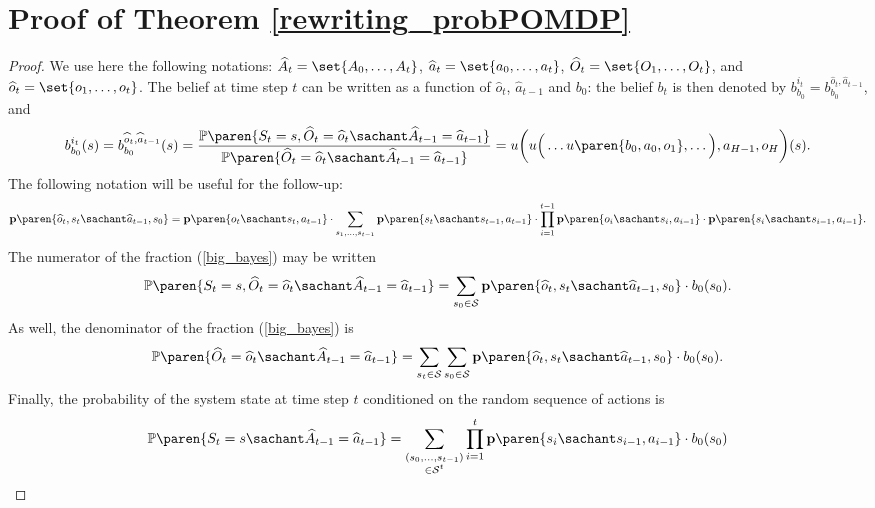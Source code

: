 \section{Proof of Theorem \ref{rewriting_probPOMDP}}
\begin{proof}
We use here the following notations: 
$\widehat{A}_{t} = \set{ A_0, \ldots, A_{t} }$,
$\widehat{a}_{t} = \set{ a_0, \ldots, a_{t} }$,
$\widehat{O}_t = \set{ O_1, \ldots, O_t }$,
and $\widehat{o}_t = \set{ o_1, \ldots, o_t }$.
The belief at time step $t$ can be written
as a function of $\widehat{o}_t$, $\widehat{a}_{t-1}$ and $b_0$:
the belief $b_t$ is then denoted by $b^{i_t}_{b_0} = b^{\widehat{o}_t,\widehat{a}_{t-1}}_{b_0}$, and
\begin{equation}
b^{i_t}_{b_0}(s) = b^{\widehat{o}_t,\widehat{a}_{t-1}}_{b_0}(s) = \dfrac{ \mathbb{P} \paren{ S_t = s, \widehat{O}_t = \widehat{o}_t \sachant \widehat{A}_{t-1} = \widehat{a}_{t-1} }  }{ \mathbb{P} \paren{ \widehat{O}_t = \widehat{o}_t \sachant \widehat{A}_{t-1} = \widehat{a}_{t-1} }  } = u \bigg( u\Big( \ldots u \paren{ b_0,a_0,o_1}, \ldots \Big), a_{H-1}, o_H \bigg)(s).
\label{big_bayes}
\end{equation}
The following notation will be useful for the follow-up:
\[ \textbf{p} \paren{ \widehat{o}_t, s_t \sachant \widehat{a}_{t-1}, s_0 } = 
\textbf{p} \paren{ o_t \sachant s_t, a_{t-1} } \cdot \displaystyle \sum_{ s_1, \ldots, s_{t-1} } \textbf{p} \paren{ s_t \sachant s_{t-1}, a_{t-1} } \cdot \displaystyle \prod_{i=1}^{t-1} \textbf{p} \paren{ o_i \sachant s_i, a_{i-1} } \cdot \textbf{p} \paren{ s_i \sachant s_{i-1}, a_{i-1} }.\]
The numerator of the fraction (\ref{big_bayes})
may be written 
\[ \mathbb{P} \paren{ S_t = s, \widehat{O}_t = \widehat{o}_t \sachant \widehat{A}_{t-1} = \widehat{a}_{t-1} } = \displaystyle \sum_{s_0 \in \mathcal{S}} \textbf{p} \paren{ \widehat{o}_t, s_t \sachant \widehat{a}_{t-1}, s_0 } \cdot b_0(s_0). \]
As well, the denominator of the fraction (\ref{big_bayes}) is
\[\mathbb{P} \paren{ \widehat{O}_t = \widehat{o}_t \sachant \widehat{A}_{t-1} = \widehat{a}_{t-1} } = \displaystyle \sum_{s_t \in \mathcal{S}} \sum_{s_0 \in \mathcal{S}}  \textbf{p} \paren{ \widehat{o}_t, s_t \sachant \widehat{a}_{t-1}, s_0 } \cdot b_0(s_0). \]
Finally, the probability of the system state at time step $t$ conditioned on the random sequence of actions is
\begin{align*} 
\mathbb{P} \paren{ S_t = s \sachant \widehat{A}_{t-1} = \widehat{a}_{t-1} } & = \sum_{\substack{ (s_0, \ldots, s_{t-1}) \\ \in \mathcal{S}^t }} \prod_{i=1}^{t} \textbf{p} \paren{ s_i \sachant s_{i-1}, a_{i-1} } \cdot b_0(s_0) \\  

\end{align*}
\end{proof}
